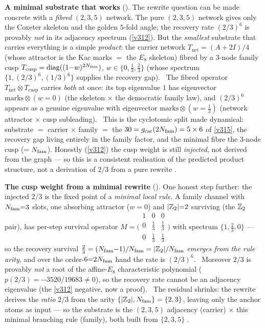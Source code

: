 \par\smallskip\noindent\textbf{A minimal substrate that works}
(). The rewrite question can be made concrete with a \emph{fibred} $(2,3,5)$
network. The pure $(2,3,5)$ network gives only
the Coxeter skeleton and the golden $5$-fold angle; the recovery rate $(2/3)^6$ is provably \emph{not} in its
adjacency spectrum (\vref{v312}). But the \emph{smallest} substrate that carries everything is a simple
\emph{product}: the carrier network $T_{\mathrm{net}}=(A{+}2I)/4$ (whose attractor is the Kac marks $=$ the $E_8$
skeleton) fibred by a $3$-node family cusp $T_{\mathrm{cusp}}=\operatorname{diag}((1{-}w)^{2N_{\mathrm{fam}}})$,
$w\in\{0,\tfrac13,\tfrac23\}$ (whose spectrum $\{1,(2/3)^6,(1/3)^6\}$ supplies the recovery gap). \mE\ The fibred
operator $T_{\mathrm{net}}\otimes T_{\mathrm{cusp}}$ carries \emph{both} at once: its top eigenvalue $1$ has
eigenvector $\mathrm{marks}\otimes(w{=}0)$ (the skeleton $\times$ the democratic family law), and $(2/3)^6$ appears
as a genuine eigenvalue with eigenvector $\mathrm{marks}\otimes(w{=}\tfrac13)$ (network attractor $\times$ cusp
subleading). \mE\ This is the cyclotomic split made dynamical: substrate $=$ carrier $\times$ family $=$ the
$30=g_{\mathrm{car}}(2N_{\mathrm{fam}})=5\times6$ of \vref{v315}, the recovery gap living entirely in the family factor, and the minimal
fibre the $3$-node cusp ($=N_{\mathrm{fam}}$). Honestly (\vref{v312}) the cusp weight is still \emph{injected}, not derived from
the graph --- so this is a consistent realisation of the predicted product structure, not a derivation of $2/3$ from
a pure rewrite \mC.

\par\smallskip\noindent\textbf{The cusp weight from a minimal rewrite}
(). One honest step further: the injected $2/3$ is the fixed point of a
\emph{minimal local rule}. A family channel with $N_{\mathrm{fam}}{=}3$ slots, one absorbing attractor ($w{=}0$) and
$|\mathbb Z_2|{=}2$ surviving (the $\mathbb Z_2$ pair), has per-step survival operator
$M=\bigl(\begin{smallmatrix}1&0&0\\0&\frac13&\frac13\\0&\frac13&\frac13\end{smallmatrix}\bigr)$ with spectrum
$\{1,\tfrac23,0\}$ --- so the recovery survival $\tfrac23=(N_{\mathrm{fam}}{-}1)/N_{\mathrm{fam}}=|\mathbb Z_2|/N_{\mathrm{fam}}$ \emph{emerges from the
rule arity}, and over the order-$6{=}2N_{\mathrm{fam}}$ hand the rate is $(2/3)^6$. \mE\ Moreover $2/3$ is provably \emph{not}
a root of the affine-$E_8$ characteristic polynomial ($p(2/3)=-3520/19683\ne0$), so the recovery rate cannot be an
adjacency eigenvalue (the \vref{v312} negative, now a proof). \mO\ The residual shrinks: the rewrite derives the
\emph{ratio} $2/3$ from the arity $\{|\mathbb Z_2|,N_{\mathrm{fam}}\}=\{2,3\}$, leaving only the anchor atoms as input --- so the
substrate is the $(2,3,5)$ adjacency (carrier) $\times$ this minimal branching rule (family), both built from
$\{2,3,5\}$ \mC.

